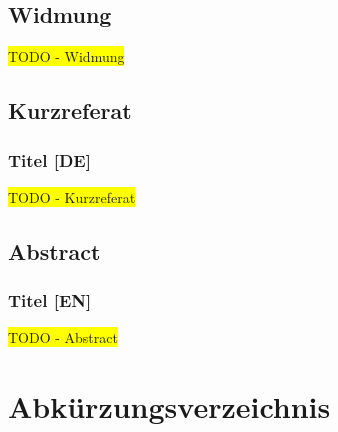 \documentclass[a4paper,12pt,twoside]{scrreprt}
\begin{document}
\section*{Widmung}
\label{sec:widmung}

\colorbox{yellow}{TODO - Widmung}

\cleardoublepage
{}
\section*{Kurzreferat}
\label{sec:abstract-de}

\subsection*{Titel [DE]}

\colorbox{yellow}{TODO - Kurzreferat}

\newpage
{}
\section*{Abstract}
\label{sec:abstract-en}

\subsection*{Titel [EN]}

\colorbox{yellow}{TODO - Abstract}

\cleardoublepage
{}
\tableofcontents

\clearpage
{}
{}
\listoffigures

\clearpage
{}
{}
\listoftables

\clearpage
{}
{}
\listoflistings

\clearpage
{}
{}
\chapter*{Abkürzungsverzeichnis}
\end{document}
